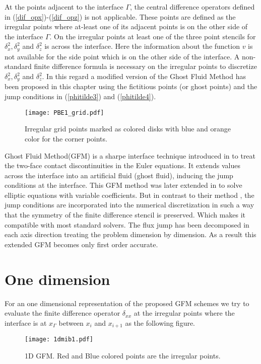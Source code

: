 At the points adjacent to the interface $\Gamma$, the central difference operators defined in (\ref{dif_opx})-(\ref{dif_opz}) is not applicable. These points are defined as the irregular points where at-least one of its adjacent points is on the other side of the interface $\Gamma$. On the irregular points at least one of the three point stencils for $\delta_x^2,\delta_y^2$ and $\delta_z^2$ is across the interface. Here the information about the function $v$ is not available for the side point which is on the other side of the interface. A non-standard finite difference formula is necessary on the irregular points to discretize $\delta_x^2,\delta_y^2$ and $\delta_z^2$.  In this regard a modified version of the Ghost Fluid Method has been proposed in this chapter using the fictitious points (or ghost points) and the jump conditions in (\ref{phitilde3}) and (\ref{phitilde4}).

\begin{figure}[!ht]
	\centering
	\texttt{[image: PBE1\_grid.pdf]}
	\caption{Irregular grid points marked as colored disks with blue and orange color for the corner points.}
	\label{fig_irgpoints}
\end{figure}


Ghost Fluid Method(GFM) is a sharpe interface technique introduced in  \cite{Fedkiw1999} to treat the two-face contact discontinuities in the Euler equations. It extends values across the interface into an artificial fluid (ghost fluid), inducing the jump conditions at the interface. This GFM method was later extended in \cite{Liu2000} to solve elliptic equations with variable coefficients. But in contrast to their method \cite{Liu2000}, the jump conditions are incorporated into the numerical discretization in such a way that the symmetry of the finite difference stencil is preserved. Which makes it compatible with most standard solvers. The flux jump has been decomposed in each axis direction treating the problem dimension by dimension. As a result this extended GFM becomes only first order accurate.   


\section{One dimension}

For an one dimensional representation of the proposed GFM schemes we try to evaluate the finite difference operator $\delta_{xx}$ at the irregular points where the interface is at $x_\Gamma$ between $x_i$ and $x_{i+1}$ as the following figure.  %
\begin{figure}[ht]
\begin{center}
\texttt{[image: 1dmib1.pdf]}\hspace{10mm}
\caption{1D GFM. Red and Blue colored points are the irregular points.}
\label{fig_1}
\end{center}
\end{figure}

